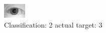 \begin{figure}[h!]
\begin{center}
\includegraphics[width=0.60\columnwidth]{figures/ID1164_class_2_target_3.png}
\end{center}
\caption{ Classification: 2 actual target: 3}
\label{fig:ID1164_class_2_target_3}
\end{figure}
